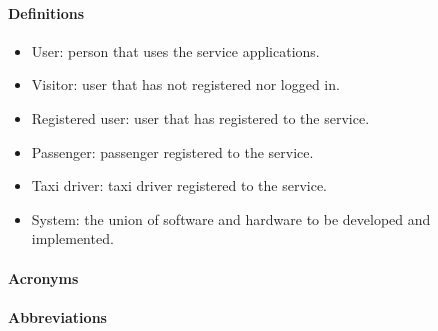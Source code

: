 \paragraph{Definitions}
\begin{itemize}
	\item User: person that uses the service applications.
	\item Visitor: user that has not registered nor logged in.
	\item Registered user: user that has registered to the service.
	\item Passenger: passenger registered to the service.
	\item Taxi driver: taxi driver registered to the service.
	\item System: the union of software and hardware to be developed and implemented.
	
	
\end{itemize}
\paragraph{Acronyms}
\paragraph{Abbreviations}